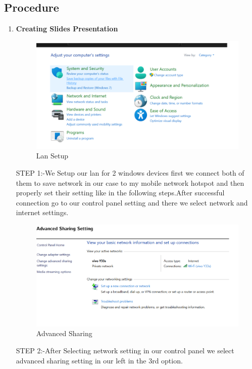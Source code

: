\documentclass[a4paper,9pt]{article}
\begin{document}
\subsection{Procedure}
\begin{enumerate}
	\item \textbf{Creating Slides Presentation}
	
	\begin{figure}[H]
		\centering
		\includegraphics[width=0.8\linewidth]{6.1.png}
		\caption{Lan Setup }
	\end{figure}
	STEP 1:-We Setup our lan for 2 windows devices first we connect both of them to save network in our case to my mobile
	network hotspot and then properly set their setting like in the following steps.After successful connection go to our control panel setting and there we select network and internet settings.
	\begin{figure}[H]
		\centering
		\includegraphics[width=0.8\linewidth]{6.2.png}
		\caption{Advanced Sharing}
	\end{figure}
	STEP 2:-After Selecting network setting in our control panel we select advanced sharing setting in our left in the 3rd
	option.
	

\end{enumerate}
\end{document}
